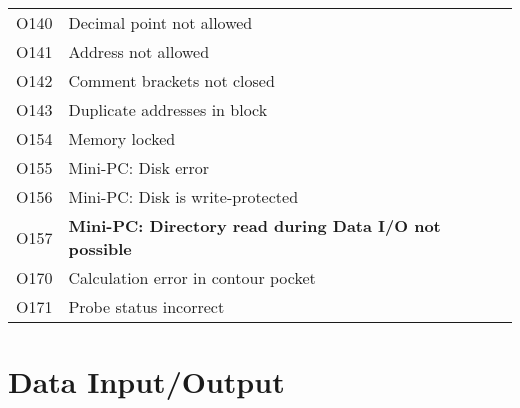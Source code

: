 \documentclass[openany,11pt]{book}
\begin{document}
\begin{table}[!h]
    \begin{tabular}{ll}
    O140 & Decimal point not allowed \\
    O141 & Address not allowed \\
    O142 & Comment brackets not closed \\
    O143 & Duplicate addresses in block \\
    O154 & Memory locked \\
    O155 & Mini-PC: Disk error \\
    O156 & Mini-PC: Disk is write-protected \\
    O157 & \textbf{Mini-PC: Directory read during Data I/O not possible} \\
    O170 & Calculation error in contour pocket \\
    O171 & Probe status incorrect \\
    \end{tabular}
\end{table}

\section*{Data Input/Output}
\end{document}
